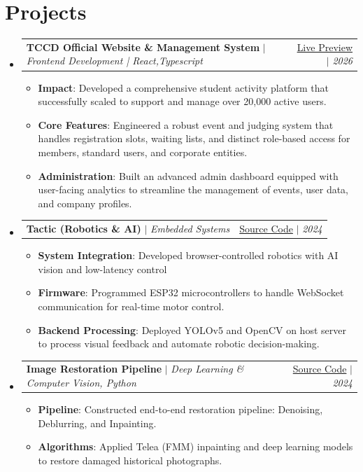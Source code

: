 \documentclass[letterpaper,11pt]{article}
\makeatletter
\newcommand{\resumeItem}[2]{\item\small{\textbf{#1}{: #2 \vspace{-2pt}}}}
\newcommand{\resumeProjectSubheading}[3]{
  \vspace{-1pt}\item
    \begin{tabular*}{0.97\textwidth}{l@{\extracolsep{\fill}}r}
      \textbf{#1} $|$ \textit{\small#2} & #3 \\
    \end{tabular*}\vspace{-5pt}
}
\newcommand{\resumeSubHeadingListStart}{\begin{itemize}[leftmargin=*]}
\newcommand{\resumeSubHeadingListEnd}{\end{itemize}}
\newcommand{\resumeItemListStart}{\begin{itemize}}
\newcommand{\resumeItemListEnd}{\end{itemize}\vspace{-5pt}}
\makeatother
\begin{document}
\section{Projects}
  \resumeSubHeadingListStart
    \resumeProjectSubheading
      {TCCD Official Website \& Management System}{Frontend Development | React,Typescript}{\href{https://tccd.eng.cu.edu.eg/}{Live Preview} $|$ \textit{\small 2026}}
      \resumeItemListStart
        \resumeItem{Impact}
          {Developed a comprehensive student activity platform that successfully scaled to support and manage over 20,000 active users.}
        \resumeItem{Core Features}
          {Engineered a robust event and judging system that handles registration slots, waiting lists, and distinct role-based access for members, standard users, and corporate entities.}
        \resumeItem{Administration}
          {Built an advanced admin dashboard equipped with user-facing analytics to streamline the management of events, user data, and company profiles.}
      \resumeItemListEnd
    \vspace{4pt}
    \resumeProjectSubheading
      {Tactic (Robotics \& AI)}{Embedded Systems}{\href{https://github.com/roboSobia}{Source Code} $|$ \textit{\small 2024}}
      \resumeItemListStart
        \resumeItem{System Integration}
          {Developed browser-controlled robotics with AI vision and low-latency control}
        \resumeItem{Firmware}
          {Programmed ESP32 microcontrollers to handle WebSocket communication for real-time motor control.}
        \resumeItem{Backend Processing}
          {Deployed YOLOv5 and OpenCV on host server to process visual feedback and automate robotic decision-making.}
      \resumeItemListEnd
    \vspace{4pt}
    \resumeProjectSubheading
      {Image Restoration Pipeline}{Deep Learning \& Computer Vision, Python}{\href{https://github.com/ahmedfathy0-0/Image-Colorization-of-Historical-Photos}{Source Code} $|$ \textit{\small 2024}}
      \resumeItemListStart
        \resumeItem{Pipeline}
          {Constructed end-to-end restoration pipeline: Denoising, Deblurring, and Inpainting.}
        \resumeItem{Algorithms}
          {Applied Telea (FMM) inpainting and deep learning models to restore damaged historical photographs.}
      \resumeItemListEnd
  \resumeSubHeadingListEnd
\end{document}
